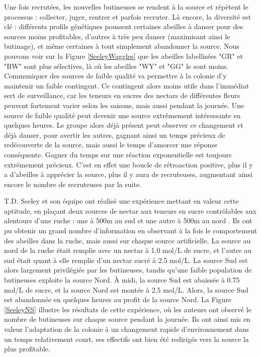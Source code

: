 			Une fois recrutées, les nouvelles butineuses se rendent à la source et répètent le processus : collecter, juger, rentrer et parfois recruter. Là encore, la diversité est clé : différents profils génétiques poussent certaines abeilles à danser pour des sources moins profitables, d'autres à très peu danser (maximisant ainsi le butinage), et même certaines à tout simplement abandonner la source. Nous pouvons voir sur la Figure \ref{SeeleyWaggles} que les abeilles labellisées "GR" et "BW" sont plus sélectives, là où les abeilles "WY" et "GG" le sont moins. Communiquer des sources de faible qualité va permettre à la colonie d'y maintenir un faible contingent. Ce contingent alors moins utile dans l'immédiat sert de surveillance, car les teneurs en sucres des nectars de différentes fleurs peuvent fortement varier selon les saisons, mais aussi pendant la journée. 
			Une source de faible qualité peut devenir une source extrêmement intéressante en quelques heures. Le groupe alors déjà présent peut observer ce changement et déjà danser, pour avertir les autres, gagnant ainsi un temps précieux de redécouverte de la source, mais aussi le temps d'amorcer une réponse conséquente. Gagner du temps sur une réaction exponentielle est toujours extrêmement précieux. 
			C'est en effet une boucle de rétroaction positive, plus il y a d'abeilles à apprécier la source, plus il y aura de recruteuses, augmentant ainsi encore le nombre de recruteuses par la suite.
			
			 T.D. Seeley et son équipe ont réalisé une expérience mettant en valeur cette aptitude, en plaçant deux sources de nectar aux teneurs en sucre contrôlables aux alentours d'une ruche : une à 500m au sud et une autre à 500m au nord \cite{seeley_collective_1991}. Ils ont pu obtenir un grand nombre d'information en observant à la fois le comportement des abeilles dans la ruche, mais aussi sur chaque source artificielle. La source au nord de la ruche était remplie avec un nectar à 1.0 mol/L de sucre, et l'autre au sud était quant à elle remplie d'un nectar sucré à 2.5 mol/L. 
			La source Sud est alors largement privilégiée par les butineuses, tandis qu'une faible population de butineuses exploite la source Nord. À midi, la source Sud est abaissée à 0.75 mol/L de sucre, et la source Nord est montée à 2.5 mol/L. Alors, la source Sud est abandonnée en quelques heures au profit de la source Nord. La Figure \ref{SeeleyNS} illustre les résultats de cette expérience, où les auteurs ont observé le nombre de butineuses sur chaque source pendant la journée. Ils ont ainsi mis en valeur l'adaptation de la colonie à un changement rapide d'environnement dans un temps relativement court, ses effectifs ont bien été redirigés vers la source la plus profitable.
			
